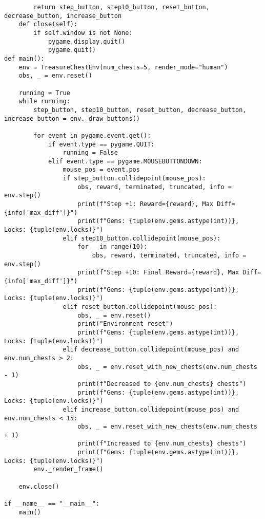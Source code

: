 \begin{lstlisting}
        return step_button, step10_button, reset_button, decrease_button, increase_button
    def close(self):
        if self.window is not None:
            pygame.display.quit()
            pygame.quit()
def main():
    env = TreasureChestEnv(num_chests=5, render_mode="human")
    obs, _ = env.reset()
    
    running = True
    while running:
        step_button, step10_button, reset_button, decrease_button, increase_button = env._draw_buttons()
        
        for event in pygame.event.get():
            if event.type == pygame.QUIT:
                running = False
            elif event.type == pygame.MOUSEBUTTONDOWN:
                mouse_pos = event.pos
                if step_button.collidepoint(mouse_pos):
                    obs, reward, terminated, truncated, info = env.step()
                    print(f"Step +1: Reward={reward}, Max Diff={info['max_diff']}")
                    print(f"Gems: {tuple(env.gems.astype(int))}, Locks: {tuple(env.locks)}")
                elif step10_button.collidepoint(mouse_pos):
                    for _ in range(10):
                        obs, reward, terminated, truncated, info = env.step()
                    print(f"Step +10: Final Reward={reward}, Max Diff={info['max_diff']}")
                    print(f"Gems: {tuple(env.gems.astype(int))}, Locks: {tuple(env.locks)}")
                elif reset_button.collidepoint(mouse_pos):
                    obs, _ = env.reset()
                    print("Environment reset")
                    print(f"Gems: {tuple(env.gems.astype(int))}, Locks: {tuple(env.locks)}")
                elif decrease_button.collidepoint(mouse_pos) and env.num_chests > 2:
                    obs, _ = env.reset_with_new_chests(env.num_chests - 1)
                    print(f"Decreased to {env.num_chests} chests")
                    print(f"Gems: {tuple(env.gems.astype(int))}, Locks: {tuple(env.locks)}")
                elif increase_button.collidepoint(mouse_pos) and env.num_chests < 15:
                    obs, _ = env.reset_with_new_chests(env.num_chests + 1)
                    print(f"Increased to {env.num_chests} chests")
                    print(f"Gems: {tuple(env.gems.astype(int))}, Locks: {tuple(env.locks)}")
        env._render_frame()
    
    env.close()

if __name__ == "__main__":
    main()
\end{lstlisting}

\newpage
\clearpage


